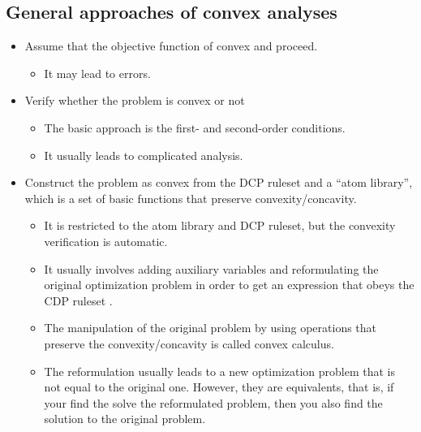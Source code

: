 \documentclass{article}
\begin{document}
\subsection{General approaches of convex analyses}
\begin{itemize}
    \item Assume that the objective function of convex and proceed.
    \begin{itemize}
        \item It may lead to errors.
    \end{itemize}
    \item Verify whether the problem is convex or not
    \begin{itemize}
        \item The basic approach is the first- and second-order conditions.
        \item It usually leads to complicated analysis.
    \end{itemize}
    \item Construct the problem as convex from the DCP ruleset and a ``atom library'', which is a set of basic functions that preserve convexity/concavity.
    \begin{itemize}
        \item It is restricted to the atom library and DCP ruleset, but the convexity verification is automatic.
        \item It usually involves adding auxiliary variables and reformulating the original optimization problem in order to get an expression that obeys the CDP ruleset \autocite{HomeConvexJl}.
        \item The manipulation of the original problem by using operations that preserve the convexity/concavity is called convex calculus\autocite{boydDisciplinedConvexProgramming}.
        \item The reformulation usually leads to a new optimization problem that is not equal to the original one. However, they are equivalents, that is, if your find the solve the reformulated problem, then you also find the solution to the original problem.
    \end{itemize}
\end{itemize}
\end{document}
